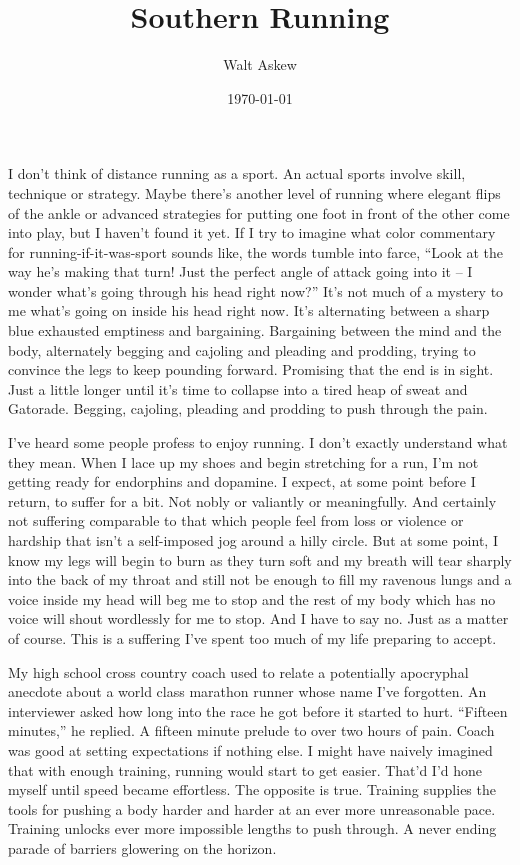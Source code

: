 \documentclass[12pt, oneside]{memoir}
\title{Southern Running}
\author{Walt Askew}
\date{\today}
\begin{document}
\maketitle

I don't think of distance running as a sport.
An actual sports involve skill, technique or strategy.
Maybe there's another level of running where elegant flips of the
ankle or advanced strategies for putting one foot in front of the
other come into play, but I haven't found it yet.
If I try to imagine what color commentary for running-if-it-was-sport
sounds like, the words tumble into farce,
``Look at the way he's making that turn! Just the perfect angle of
attack going into it -- I wonder what's going through his head right
now?''
It's not much of a mystery to me what's going on inside his head right
now. 
It's alternating between a sharp blue exhausted emptiness and
bargaining.
Bargaining between the mind and the body, alternately begging and
cajoling and pleading and prodding, trying to convince the legs to
keep pounding forward.
Promising that the end is in sight.
Just a little longer until it's time to collapse into a tired heap of
sweat and Gatorade. 
Begging, cajoling, pleading and prodding to push through the pain.

I've heard some people profess to enjoy running.
I don't exactly understand what they mean.
When I lace up my shoes and begin stretching for a run, I'm not
getting ready for endorphins and dopamine.
I expect, at some point before I return, to suffer for a bit.
Not nobly or valiantly or meaningfully.
And certainly not suffering comparable to that which people feel from
loss or violence or hardship that isn't a self-imposed jog around a
hilly circle.
But at some point, I know my legs will begin to burn as they turn
soft and my breath will tear sharply into the back of my throat and
still not be enough to fill my ravenous lungs and a voice inside my
head will beg me to stop and the rest of my body which has no voice
will shout wordlessly for me to stop.
And I have to say no.
Just as a matter of course.
This is a suffering I've spent too much of my life preparing to
accept.

My high school cross country coach used to relate a potentially
apocryphal anecdote about a world class marathon runner whose name
I've forgotten.
An interviewer asked how long into the race he got before it started
to hurt.
``Fifteen minutes,'' he replied.
A fifteen minute prelude to over two hours of pain.
Coach was good at setting expectations if nothing else.
I might have naively imagined that with enough training,
running would start to get easier.
That'd I'd hone myself until speed became effortless.
The opposite is true.
Training supplies the tools for pushing a body harder and harder at an
ever more unreasonable pace.
Training unlocks ever more impossible lengths to push through.
A never ending parade of barriers glowering on the horizon.
\end{document}
